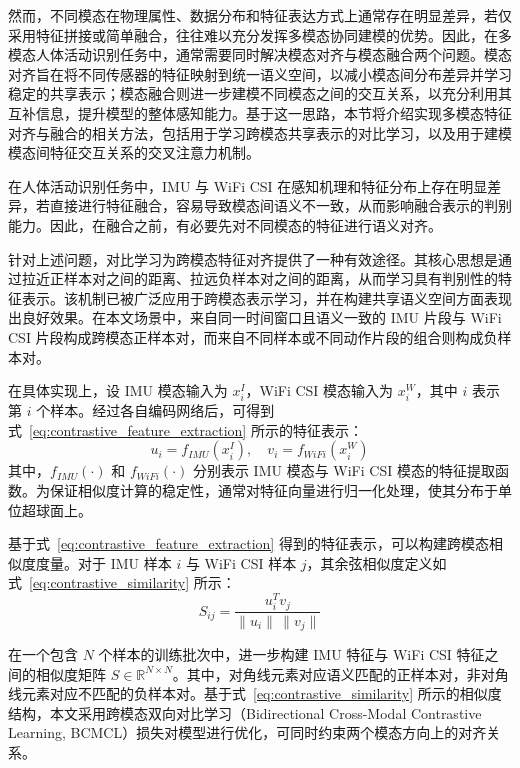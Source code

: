 然而，不同模态在物理属性、数据分布和特征表达方式上通常存在明显差异，若仅采用特征拼接或简单融合，往往难以充分发挥多模态协同建模的优势。因此，在多模态人体活动识别任务中，通常需要同时解决模态对齐与模态融合两个问题。模态对齐旨在将不同传感器的特征映射到统一语义空间，以减小模态间分布差异并学习稳定的共享表示；模态融合则进一步建模不同模态之间的交互关系，以充分利用其互补信息，提升模型的整体感知能力。基于这一思路，本节将介绍实现多模态特征对齐与融合的相关方法，包括用于学习跨模态共享表示的对比学习，以及用于建模模态间特征交互关系的交叉注意力机制。


在人体活动识别任务中，IMU 与 WiFi CSI 在感知机理和特征分布上存在明显差异，若直接进行特征融合，容易导致模态间语义不一致，从而影响融合表示的判别能力。因此，在融合之前，有必要先对不同模态的特征进行语义对齐。

针对上述问题，对比学习为跨模态特征对齐提供了一种有效途径。其核心思想是通过拉近正样本对之间的距离、拉远负样本对之间的距离，从而学习具有判别性的特征表示。该机制已被广泛应用于跨模态表示学习，并在构建共享语义空间方面表现出良好效果\cite{choi2023multimodal,li2025multiEntityAlignment,yang2024multimodalCode,yin2023dualContrastive}。在本文场景中，来自同一时间窗口且语义一致的 IMU 片段与 WiFi CSI 片段构成跨模态正样本对，而来自不同样本或不同动作片段的组合则构成负样本对。

在具体实现上，设 IMU 模态输入为 $x_i^{I}$，WiFi CSI 模态输入为 $x_i^{W}$，其中 $i$ 表示第 $i$ 个样本。经过各自编码网络后，可得到式~\eqref{eq:contrastive_feature_extraction} 所示的特征表示：
\begin{equation}
u_i = f_{IMU}(x_i^{I}), \quad v_i = f_{WiFi}(x_i^{W})
\label{eq:contrastive_feature_extraction}
\end{equation}
其中，$f_{IMU}(\cdot)$ 和 $f_{WiFi}(\cdot)$ 分别表示 IMU 模态与 WiFi CSI 模态的特征提取函数。为保证相似度计算的稳定性，通常对特征向量进行归一化处理，使其分布于单位超球面上。

基于式~\eqref{eq:contrastive_feature_extraction} 得到的特征表示，可以构建跨模态相似度度量。对于 IMU 样本 $i$ 与 WiFi CSI 样本 $j$，其余弦相似度定义如式~\eqref{eq:contrastive_similarity} 所示：
\begin{equation}
S_{ij} = \frac{u_i^T v_j}{\|u_i\| \, \|v_j\|}
\label{eq:contrastive_similarity}
\end{equation}

在一个包含 $N$ 个样本的训练批次中，进一步构建 IMU 特征与 WiFi CSI 特征之间的相似度矩阵 $S \in \mathbb{R}^{N \times N}$。其中，对角线元素对应语义匹配的正样本对，非对角线元素对应不匹配的负样本对。基于式~\eqref{eq:contrastive_similarity} 所示的相似度结构，本文采用跨模态双向对比学习（Bidirectional Cross-Modal Contrastive Learning, BCMCL）损失对模型进行优化，可同时约束两个模态方向上的对齐关系。

